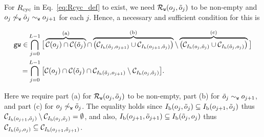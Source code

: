 \documentclass[
 prx,
 reprint,
 superscriptaddress,
 longbibliography,
 dvipsnames
]{revtex4-2}
\begin{document}
For $R_{\mathrm{cyc}}$ in Eq.~\eqref{eq:Rcyc_def} to exist, we need $\mathcal{R}_{\texttt{w}}\qty(o_j, \tilde{o}_j)$ to be non-empty and $o_j \not\sim_{\texttt{w}} \tilde{o}_j \sim_{\texttt{w}} o_{j+1}$ for each $j$.
Hence, a necessary and sufficient condition for this is
\begin{widetext}
\begin{align}
    \texttt{gw} \in &\bigcap_{j=0}^{L-1} \big[ \overbrace{\mathcal{C}\qty(o_j) \cap \mathcal{C}\qty(\tilde{o}_j)}^{\text{(a)}} \cap \overbrace{\qty(\mathcal{C}_{I_{\mathrm{b}}\qty(\tilde{o}_j, o_{j+1})} \cup \mathcal{C}_{I_{\mathrm{b}}\qty(o_{j+1}, \tilde{o}_j)})}^{\text{(b)}} \setminus \overbrace{\qty( \mathcal{C}_{I_{\mathrm{b}}\qty(o_j, \tilde{o}_j)} \cup \mathcal{C}_{I_{\mathrm{b}}\qty(\tilde{o}_j, o_j)})}^{\text{(c)}} \big] \nonumber \\
    =& \bigcap_{j=0}^{L-1} \qty[\mathcal{C}\qty(o_j) \cap \mathcal{C}\qty(\tilde{o}_j) \cap \mathcal{C}_{I_{\mathrm{b}}\qty(\tilde{o}_j, o_{j+1})} \setminus \mathcal{C}_{I_{\mathrm{b}}\qty(o_j, \tilde{o}_j)}].
\label{eq:Rcyc_exist_cond}
\end{align}
\end{widetext}
Here we require part (a) for $\mathcal{R}_{\texttt{w}}\qty(o_j, \tilde{o}_j)$ to be non-empty, part (b) for $\tilde{o}_j \sim_{\texttt{w}} o_{j+1}$, and part (c) for $o_j \not\sim_{\texttt{w}} \tilde{o}_j$.
The equality holds since $I_{\mathrm{b}}\qty(o_j, \tilde{o}_j) \subseteq I_{\mathrm{b}}\qty(o_{j+1}, \tilde{o}_{j})$ thus $\mathcal{C}_{I_{\mathrm{b}}\qty(o_{j+1}, \tilde{o}_{j})} \setminus \mathcal{C}_{I_{\mathrm{b}}\qty(o_j, \tilde{o}_j)} = \emptyset$, and also, $I_{\mathrm{b}}\qty(o_{j+1}, \tilde{o}_{j+1}) \subseteq I_{\mathrm{b}}\qty(\tilde{o}_j, o_j)$ thus $\mathcal{C}_{I_{\mathrm{b}}\qty(\tilde{o}_j, o_j)} \subseteq \mathcal{C}_{I_{\mathrm{b}}\qty(o_{j+1}, \tilde{o}_{j+1})}$.
\end{document}
